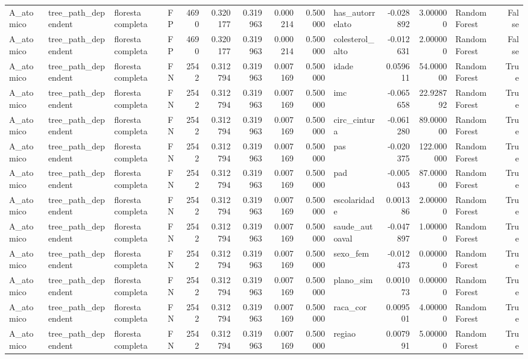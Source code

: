 \begin{tabular}{llllrrrrrlrrlr}
A_atomico & tree_path_dependent & floresta completa & FP & 4690 & 0.320177 & 0.319963 & 0.000214 & 0.500000 & has_autorrelato & -0.028892 & 3.000000 & Random Forest & False \\
A_atomico & tree_path_dependent & floresta completa & FP & 4690 & 0.320177 & 0.319963 & 0.000214 & 0.500000 & colesterol_alto & -0.012631 & 2.000000 & Random Forest & False \\
A_atomico & tree_path_dependent & floresta completa & FN & 2542 & 0.312794 & 0.319963 & 0.007169 & 0.500000 & idade & 0.059611 & 54.000000 & Random Forest & True \\
A_atomico & tree_path_dependent & floresta completa & FN & 2542 & 0.312794 & 0.319963 & 0.007169 & 0.500000 & imc & -0.065658 & 22.928792 & Random Forest & True \\
A_atomico & tree_path_dependent & floresta completa & FN & 2542 & 0.312794 & 0.319963 & 0.007169 & 0.500000 & circ_cintura & -0.061280 & 89.000000 & Random Forest & True \\
A_atomico & tree_path_dependent & floresta completa & FN & 2542 & 0.312794 & 0.319963 & 0.007169 & 0.500000 & pas & -0.020375 & 122.000000 & Random Forest & True \\
A_atomico & tree_path_dependent & floresta completa & FN & 2542 & 0.312794 & 0.319963 & 0.007169 & 0.500000 & pad & -0.005043 & 87.000000 & Random Forest & True \\
A_atomico & tree_path_dependent & floresta completa & FN & 2542 & 0.312794 & 0.319963 & 0.007169 & 0.500000 & escolaridade & 0.001386 & 2.000000 & Random Forest & True \\
A_atomico & tree_path_dependent & floresta completa & FN & 2542 & 0.312794 & 0.319963 & 0.007169 & 0.500000 & saude_autoaval & -0.047897 & 1.000000 & Random Forest & True \\
A_atomico & tree_path_dependent & floresta completa & FN & 2542 & 0.312794 & 0.319963 & 0.007169 & 0.500000 & sexo_fem & -0.012473 & 0.000000 & Random Forest & True \\
A_atomico & tree_path_dependent & floresta completa & FN & 2542 & 0.312794 & 0.319963 & 0.007169 & 0.500000 & plano_sim & 0.001073 & 0.000000 & Random Forest & True \\
A_atomico & tree_path_dependent & floresta completa & FN & 2542 & 0.312794 & 0.319963 & 0.007169 & 0.500000 & raca_cor & 0.009501 & 4.000000 & Random Forest & True \\
A_atomico & tree_path_dependent & floresta completa & FN & 2542 & 0.312794 & 0.319963 & 0.007169 & 0.500000 & regiao & 0.007991 & 5.000000 & Random Forest & True \\

\end{tabular}
